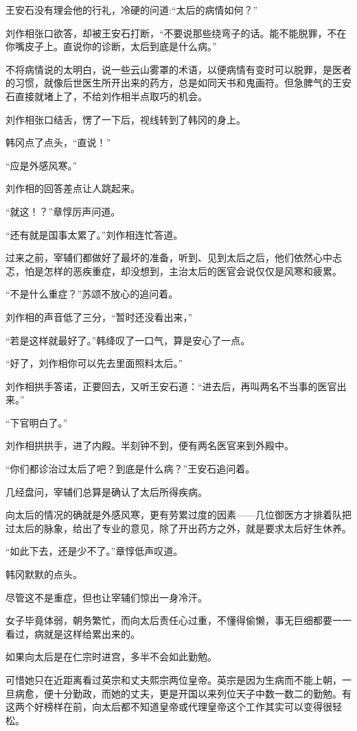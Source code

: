 王安石没有理会他的行礼，冷硬的问道:“太后的病情如何？”

刘作相张口欲答，却被王安石打断，“不要说那些绕弯子的话。能不能脱罪，不在你嘴皮子上。直说你的诊断，太后到底是什么病。”

不将病情说的太明白，说一些云山雾罩的术语，以便病情有变时可以脱罪，是医者的习惯，就像后世医生所开出来的药方，总是如同天书和鬼画符。但急脾气的王安石直接就堵上了，不给刘作相半点取巧的机会。

刘作相张口结舌，愣了一下后，视线转到了韩冈的身上。

韩冈点了点头，“直说！”

“应是外感风寒。”

刘作相的回答差点让人跳起来。

“就这！？”章惇厉声问道。

“还有就是国事太累了。”刘作相连忙答道。

过来之前，宰辅们都做好了最坏的准备，听到、见到太后之后，他们依然心中忐忑，怕是怎样的恶疾重症，却没想到，主治太后的医官会说仅仅是风寒和疲累。

“不是什么重症？”苏颂不放心的追问着。

刘作相的声音低了三分，“暂时还没看出来，”

“若是这样就最好了。”韩绛叹了一口气，算是安心了一点。

“好了，刘作相你可以先去里面照料太后。”

刘作相拱手答诺，正要回去，又听王安石道：“进去后，再叫两名不当事的医官出来。”

“下官明白了。”

刘作相拱拱手，进了内殿。半刻钟不到，便有两名医官来到外殿中。

“你们都诊治过太后了吧？到底是什么病？”王安石追问着。

几经盘问，宰辅们总算是确认了太后所得疾病。

向太后的情况的确就是外感风寒，更有劳累过度的因素——几位御医方才排着队把过太后的脉象，给出了专业的意见，除了开出药方之外，就是要求太后好生休养。

“如此下去，还是少不了。”章惇低声叹道。

韩冈默默的点头。

尽管这不是重症，但也让宰辅们惊出一身冷汗。

女子毕竟体弱，朝务繁忙，而向太后责任心过重，不懂得偷懒，事无巨细都要一一看过，病就是这样给累出来的。

如果向太后是在仁宗时进宫，多半不会如此勤勉。

可惜她只在近距离看过英宗和丈夫熙宗两位皇帝。英宗是因为生病而不能上朝，一旦病愈，便十分勤政，而她的丈夫，更是开国以来列位天子中数一数二的勤勉。有这两个好榜样在前，向太后都不知道皇帝或代理皇帝这个工作其实可以变得很轻松。

